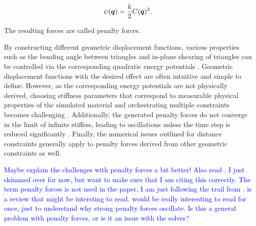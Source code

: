 \begin{equation}\label{eq:penalty-forces}
    \psi(\bm{q}) = \frac{k}{2} C(\bm{q})^2.
\end{equation}

\noindent The resulting forces are called penalty forces.

By constructing different geometric displacement functions, various properties such as the bending angle between triangles and in-plane 
shearing of triangles can be controlled via the corresponding quadratic energy potentials \cite{baraff1998}. Geometric displacement 
functions with the desired effect are often intuitive and simple to define. However, as the corresponding energy potentials are not physically 
derived, choosing stiffness parameters that correspond to measurable physical properties of the simulated material and orchestrating 
multiple constraints becomes challenging \cite{servin2006, nealen2006}. Additionally, the generated penalty forces do not converge in the 
limit of infinite stiffess, leading to oscillations unless the time step is reduced significantly \cite{rubin1957}. Finally, the numerical
issues outlined for distance constraints generally apply to penalty forces derived from other geometric constraints as well.

\textcolor{blue}{Maybe explain the challenges with penalty forces a bit better! Also read \cite{terz1987, nealen2006, rubin1957}. 
I just skimmed over \cite{terz1987} for now, but want to make sure that I am citing this correctly. The term penalty forces is not used
in the paper, I am just following the trail from \cite{servin2006}. \cite{nealen2006} is a review that might be intersting to read.
\cite{rubin1957} would be really interesting to read for once, just to understand why strong penalty forces oscillate. Is this a
general problem with penalty forces, or is it an issue with the solver?}

